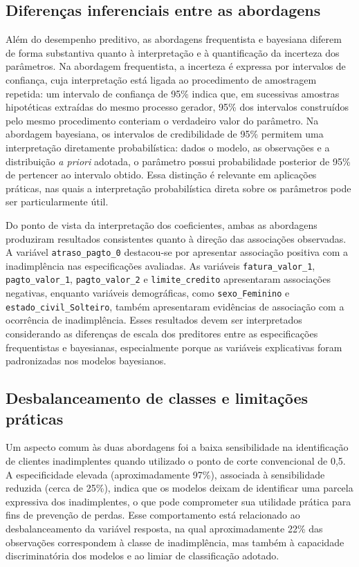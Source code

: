 \documentclass[
  brazilian,
  12pt,
  letterpaper,
  DIV=11,
  numbers=noendperiod]{scrartcl}
\begin{document}
\subsection{Diferenças inferenciais entre as
abordagens}\label{diferenuxe7as-inferenciais-entre-as-abordagens}

Além do desempenho preditivo, as abordagens frequentista e bayesiana
diferem de forma substantiva quanto à interpretação e à quantificação da
incerteza dos parâmetros. Na abordagem frequentista, a incerteza é
expressa por intervalos de confiança, cuja interpretação está ligada ao
procedimento de amostragem repetida: um intervalo de confiança de 95\%
indica que, em sucessivas amostras hipotéticas extraídas do mesmo
processo gerador, 95\% dos intervalos construídos pelo mesmo
procedimento conteriam o verdadeiro valor do parâmetro. Na abordagem
bayesiana, os intervalos de credibilidade de 95\% permitem uma
interpretação diretamente probabilística: dados o modelo, as observações
e a distribuição \emph{a priori} adotada, o parâmetro possui
probabilidade posterior de 95\% de pertencer ao intervalo obtido. Essa
distinção é relevante em aplicações práticas, nas quais a interpretação
probabilística direta sobre os parâmetros pode ser particularmente útil.

Do ponto de vista da interpretação dos coeficientes, ambas as abordagens
produziram resultados consistentes quanto à direção das associações
observadas. A variável \texttt{atraso\_pagto\_0} destacou-se por
apresentar associação positiva com a inadimplência nas especificações
avaliadas. As variáveis \texttt{fatura\_valor\_1},
\texttt{pagto\_valor\_1}, \texttt{pagto\_valor\_2} e
\texttt{limite\_credito} apresentaram associações negativas, enquanto
variáveis demográficas, como \texttt{sexo\_Feminino} e
\texttt{estado\_civil\_Solteiro}, também apresentaram evidências de
associação com a ocorrência de inadimplência. Esses resultados devem ser
interpretados considerando as diferenças de escala dos preditores entre
as especificações frequentistas e bayesianas, especialmente porque as
variáveis explicativas foram padronizadas nos modelos bayesianos.

\subsection{Desbalanceamento de classes e limitações
práticas}\label{desbalanceamento-de-classes-e-limitauxe7uxf5es-pruxe1ticas}

Um aspecto comum às duas abordagens foi a baixa sensibilidade na
identificação de clientes inadimplentes quando utilizado o ponto de
corte convencional de 0,5. A especificidade elevada (aproximadamente
97\%), associada à sensibilidade reduzida (cerca de 25\%), indica que os
modelos deixam de identificar uma parcela expressiva dos inadimplentes,
o que pode comprometer sua utilidade prática para fins de prevenção de
perdas. Esse comportamento está relacionado ao desbalanceamento da
variável resposta, na qual aproximadamente 22\% das observações
correspondem à classe de inadimplência, mas também à capacidade
discriminatória dos modelos e ao limiar de classificação adotado.
\end{document}
